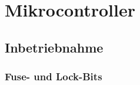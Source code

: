 \section{Mikrocontroller}\label{Appendix:Mikrocontroller}


\subsection{Inbetriebnahme}
\subsubsection{Fuse- und Lock-Bits}\label{Appendix:Fuse_Bits}


%
%
%


